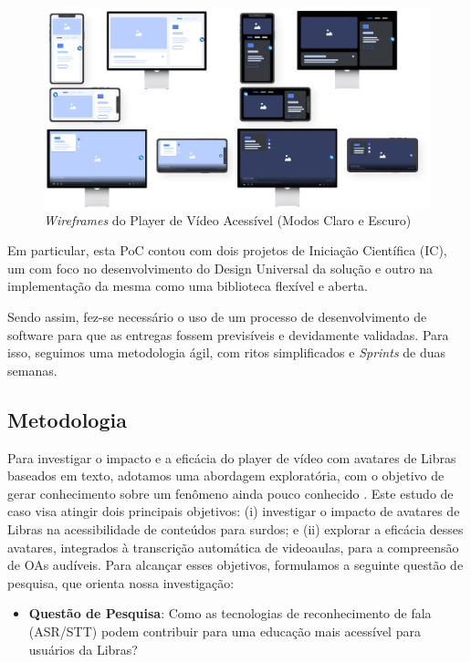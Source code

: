 \begin{figure}[htbp]
\centering
\caption{\textit{Wireframes} do Player de Vídeo Acessível (Modos Claro e Escuro)}
\label{fig:chapter4-cs2-poc-wireframes}
\includegraphics[width=1\textwidth]{images/chapter4-cs2-poc-wireframes.png}
\end{figure}

Em particular, esta PoC contou com dois projetos de Iniciação Científica (IC), um com foco no desenvolvimento do Design Universal da solução e outro na implementação da mesma como uma biblioteca flexível e aberta.

Sendo assim, fez-se necessário o uso de um processo de desenvolvimento de software para que as entregas fossem previsíveis e devidamente validadas. Para isso, seguimos uma metodologia ágil, com ritos simplificados e \textit{Sprints} de duas semanas.

\subsection{Metodologia}

Para investigar o impacto e a eficácia do player de vídeo com avatares de Libras baseados em texto, adotamos uma abordagem exploratória, com o objetivo de gerar conhecimento sobre um fenômeno ainda pouco conhecido \cite{CastroFilho2021}. Este estudo de caso visa atingir dois principais objetivos: (i) investigar o impacto de avatares de Libras na acessibilidade de conteúdos para surdos; e (ii) explorar a eficácia desses avatares, integrados à transcrição automática de videoaulas, para a compreensão de OAs audíveis. Para alcançar esses objetivos, formulamos a seguinte questão de pesquisa, que orienta nossa investigação:

\begin{itemize}
\item \textbf{Questão de Pesquisa}: Como as tecnologias de reconhecimento de fala (ASR/STT) podem contribuir para uma educação mais acessível para usuários da Libras?
\end{itemize}

